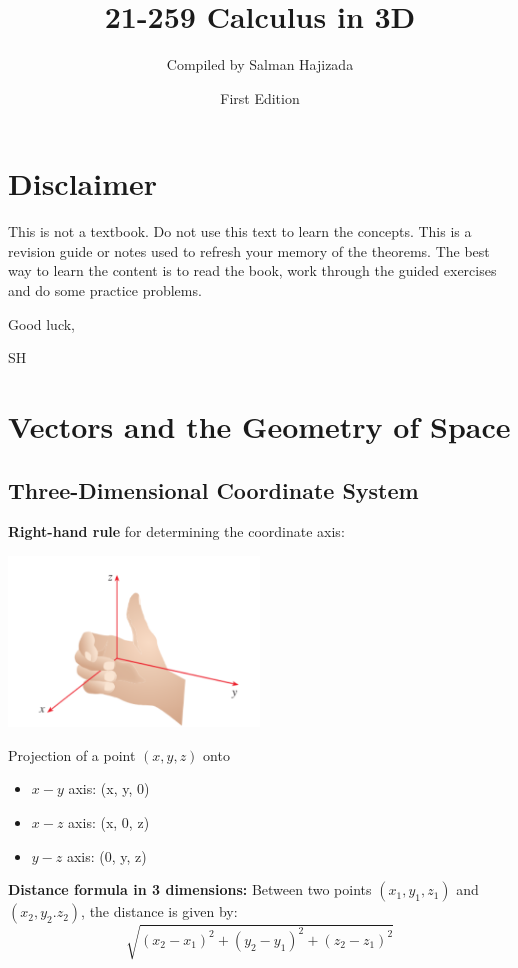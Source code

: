 \documentclass{report}
\title{21-259 Calculus in 3D}
\date{First Edition}
\author{Compiled by Salman Hajizada}
\begin{document}
\maketitle

\setcounter{chapter}{-1}
\chapter{Disclaimer}
This is not a textbook. Do not use this text to learn the concepts.
This is a revision guide or notes used to refresh your memory of the theorems. 
The best way to learn the content is to read the book, work through
the guided exercises and do some practice problems. 

Good luck,

SH
\setcounter{chapter}{11}
\chapter{Vectors and the Geometry of Space}

\section{Three-Dimensional Coordinate System}

\textbf{Right-hand rule} for determining the coordinate axis:
\begin{center}
    \includegraphics[width=0.5\textwidth]{images/right_hand_rule.png}
\end{center}

Projection of a point $(x, y, z)$ onto
\begin{itemize}
    \item $x-y$ axis: (x, y, 0)
    \item $x-z$ axis: (x, 0, z)
    \item $y-z$ axis: (0, y, z)
\end{itemize} 

\textbf{Distance formula in 3 dimensions:} Between two points $(x_1, y_1, z_1)$ and 
$(x_2, y_2. z_2)$, the distance is given by:
\[\sqrt{(x_2 - x_1)^2 + (y_2 - y_1)^2 +(z_2 - z_1)^2}\]
\end{document}
